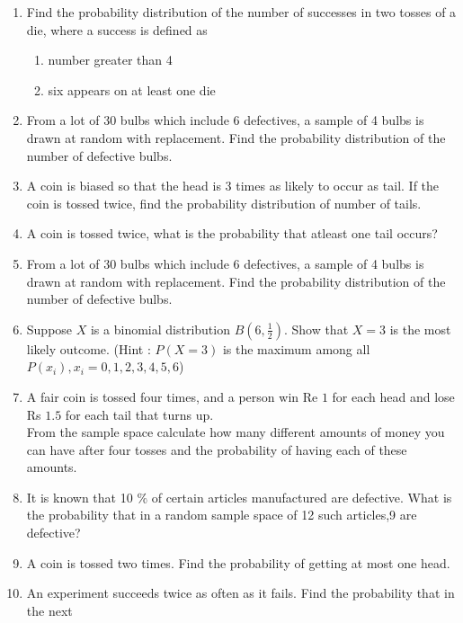 \begin{enumerate}[label=\thesection.\arabic*,ref=\thesection.\theenumi]
\item Find the probability distribution of the number of successes in two tosses of a die,
where a success is defined as
\begin{enumerate}
\item number greater than 4
\item six appears on at least one die
\end{enumerate}
\item From a lot of 30 bulbs which include 6 defectives, a sample of 4 bulbs is drawn
at random with replacement. Find the probability distribution of the number of
defective bulbs.
\item A coin is biased so that the head is 3 times as likely to occur as tail. If the coin is
tossed twice, find the probability distribution of number of tails.
\item A coin is tossed twice, what is the probability that atleast one tail occurs?
\\
\solution

\item From a lot of 30 bulbs which include 6 defectives, a sample of 4 bulbs is drawn
at random with replacement. Find the probability distribution of the number of
defective bulbs.
 \item Suppose $X$ is a binomial distribution $B\left(6,\frac{1}{2}\right)$. Show that $X=3$ is the most likely outcome.
(Hint : $P(X=3)$ is the maximum among all $P(x_i),x_i=0,1,2,3,4,5,6$)

\item A fair coin is tossed four times, and a person win Re $1$ for each head and lose Rs $1.5$ for each tail that turns up.\\
From the sample space calculate how many different amounts of money you can have after four tosses and the probability of having each of these amounts.
\\
\solution

\item It is known that 10 $\%$ of certain articles manufactured are defective. What is the probability that in a random sample space of 12 such articles,9 are defective? \\
\solution

\item A coin is tossed two times. Find the probability of getting at most one head.
\\
\solution

\item An experiment succeeds twice as often as it fails. Find the probability that in the next

\end{enumerate}
